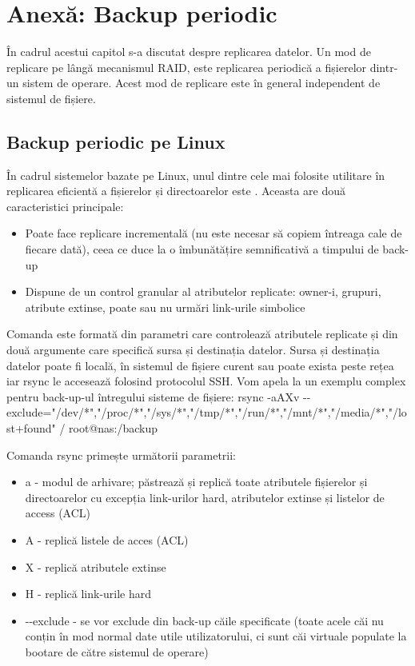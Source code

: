 \section{Anexă: Backup periodic}
\label{sec:storage-backup}

În cadrul acestui capitol s-a discutat despre replicarea datelor. Un mod de
replicare pe lângă mecanismul RAID, este replicarea periodică a fișierelor
dintr-un sistem de operare. Acest mod de replicare este în general independent
de sistemul de fișiere.

\subsection{Backup periodic pe Linux}
\label{sec:storage-backup-linux}

În cadrul sistemelor bazate pe Linux, unul dintre cele mai folosite utilitare în
replicarea eficientă a fișierelor și directoarelor este . Aceasta are
două caracteristici principale:

\begin{itemize}
	\item Poate face replicare incrementală (nu este necesar să copiem
		întreaga cale de fiecare dată), ceea ce duce la o îmbunătățire
		semnificativă a timpului de back-up
	\item Dispune de un control granular al atributelor replicate: owner-i,
		grupuri, atribute extinse, poate sau nu urmări link-urile
		simbolice
\end{itemize}

Comanda  este formată din parametri care controlează atributele
replicate și din două argumente care specifică sursa și destinația datelor.
Sursa și destinația datelor poate fi locală, în sistemul de fișiere curent sau
poate exista peste rețea iar rsync le accesează folosind protocolul SSH. Vom
apela la un exemplu complex pentru back-up-ul întregului sisteme de fișiere:
rsync -aAXv
-{}-exclude={"/dev/*","/proc/*","/sys/*","/tmp/*","/run/*","/mnt/*","/media/*","/lost+found"}
/ root@nas:/backup

Comanda rsync primește următorii parametrii:

\begin{itemize}
	\item a - modul de arhivare; păstrează și replică toate atributele
		fișierelor și directoarelor cu excepția link-urilor hard,
		atributelor extinse și listelor de access (ACL)
	\item A - replică listele de acces (ACL)
	\item X - replică atributele extinse
	\item H - replică link-urile hard
	\item -{}-exclude - se vor exclude din back-up căile specificate (toate
		acele căi nu conțin în mod normal date utile utilizatorului, ci
		sunt căi virtuale populate la bootare de către sistemul de
		operare)
\end{itemize}

